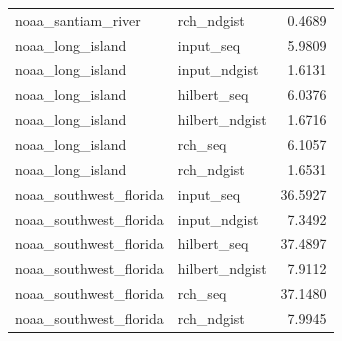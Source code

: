 \begin{tabular}{llr}
noaa\_santiam\_river & rch\_ndgist & 0.4689 \\
noaa\_long\_island & input\_seq & 5.9809 \\
noaa\_long\_island & input\_ndgist & 1.6131 \\
noaa\_long\_island & hilbert\_seq & 6.0376 \\
noaa\_long\_island & hilbert\_ndgist & 1.6716 \\
noaa\_long\_island & rch\_seq & 6.1057 \\
noaa\_long\_island & rch\_ndgist & 1.6531 \\
noaa\_southwest\_florida & input\_seq & 36.5927 \\
noaa\_southwest\_florida & input\_ndgist & 7.3492 \\
noaa\_southwest\_florida & hilbert\_seq & 37.4897 \\
noaa\_southwest\_florida & hilbert\_ndgist & 7.9112 \\
noaa\_southwest\_florida & rch\_seq & 37.1480 \\
noaa\_southwest\_florida & rch\_ndgist & 7.9945 \\
\end{tabular}
